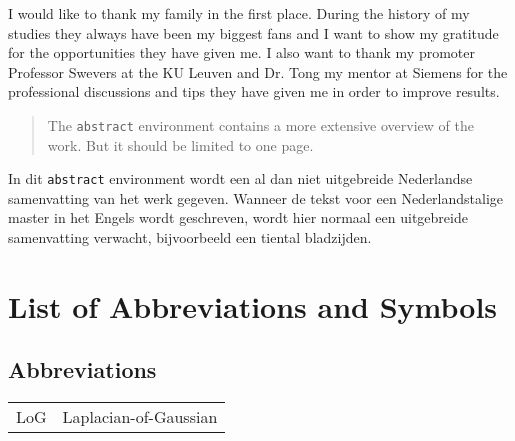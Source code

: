 \documentclass[master=elt,masteroption=eg,english]{kulemt}
\begin{document}

\begin{preface}
	I would like to thank my family in the first place. During the history of my studies they always have been my biggest fans and I want to show my gratitude for the opportunities they have given me. I also want to thank my promoter Professor Swevers at the KU Leuven and Dr. Tong my mentor at Siemens for the professional discussions and tips they have given me in order to improve results.

\end{preface}

\tableofcontents*

\begin{abstract}
  The \texttt{abstract} environment contains a more extensive overview of
  the work. But it should be limited to one page.

  \lipsum[1]
\end{abstract}

\begin{abstract*}
  In dit \texttt{abstract} environment wordt een al dan niet uitgebreide
  Nederlandse samenvatting van het werk gegeven.
  Wanneer de tekst voor een Nederlandstalige master in het Engels wordt
  geschreven, wordt hier normaal een uitgebreide samenvatting verwacht,
  bijvoorbeeld een tiental bladzijden. 

  \lipsum[1]
\end{abstract*}

\listoffiguresandtables
\chapter{List of Abbreviations and Symbols}
\section*{Abbreviations}
\begin{flushleft}
  \renewcommand{\arraystretch}{1.1}
  \begin{tabularx}{\textwidth}{@{}p{12mm}X@{}}
    LoG   & Laplacian-of-Gaussian \\
  \end{tabularx}
\end{flushleft}
\end{document}

